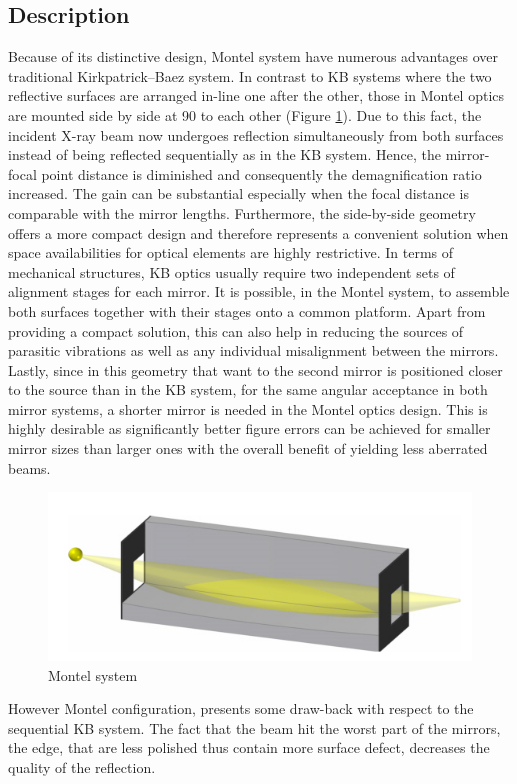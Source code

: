 \subsection{Description}
\hspace{10mm} Because of its distinctive design, Montel system have numerous advantages over traditional Kirkpatrick–Baez system. In contrast to KB systems where the two reflective surfaces are arranged in-line one after the other, those in Montel optics are mounted side by side at 90 to each other (Figure \ref{fig: MontelSystem1}). Due to this fact, the incident X-ray beam now undergoes reflection simultaneously from both surfaces instead of being reflected sequentially as in the KB system. Hence, the mirror-focal point distance is diminished and consequently the demagnification ratio increased. The gain can be substantial especially when the focal distance is comparable with the mirror lengths. Furthermore, the side-by-side geometry offers a more compact design and therefore represents a convenient solution when space availabilities for optical elements are highly restrictive. In terms of mechanical structures, KB optics usually require two independent sets of alignment stages for each mirror. It is possible, in the Montel system, to assemble both surfaces together with their stages onto a common platform. Apart from providing a compact solution, this can also help in reducing the sources of parasitic vibrations as well as any individual misalignment between the mirrors. Lastly, since in this geometry that want to the second mirror is positioned closer to the source than in the KB system, for the same angular acceptance in both mirror systems, a shorter mirror is needed in the Montel optics design. This is highly desirable as significantly better figure errors can be achieved for smaller mirror sizes than larger ones with the overall benefit of yielding less aberrated beams.
\begin{figure}[H]
%
\centering
%
\includegraphics[width=.6\textwidth]{Immagini/Chapter2/MontelSystem}
%
\caption{Montel system}
%
\label{fig: MontelSystem1}
%
\end{figure}
%
\noindent However Montel configuration, presents some draw-back with respect to the sequential KB system. The fact that the beam hit the worst part of the mirrors, the edge, that are less polished thus contain more surface defect, decreases the quality of the reflection.
